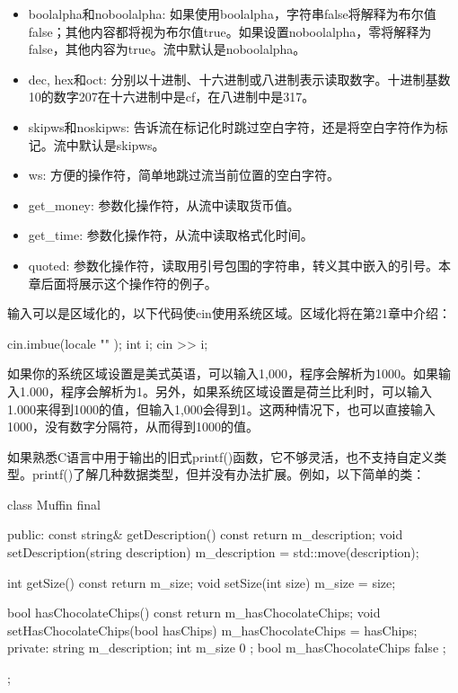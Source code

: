 \begin{itemize}
\item
boolalpha和noboolalpha: 如果使用boolalpha，字符串false将解释为布尔值false；其他内容都将视为布尔值true。如果设置noboolalpha，零将解释为false，其他内容为true。流中默认是noboolalpha。

\item
dec, hex和oct: 分别以十进制、十六进制或八进制表示读取数字。十进制基数10的数字207在十六进制中是cf，在八进制中是317。

\item
skipws和noskipws: 告诉流在标记化时跳过空白字符，还是将空白字符作为标记。流中默认是skipws。

\item
ws: 方便的操作符，简单地跳过流当前位置的空白字符。

\item
get\_money: 参数化操作符，从流中读取货币值。

\item
get\_time: 参数化操作符，从流中读取格式化时间。

\item
quoted: 参数化操作符，读取用引号包围的字符串，转义其中嵌入的引号。本章后面将展示这个操作符的例子。
\end{itemize}

输入可以是区域化的，以下代码使cin使用系统区域。区域化将在第21章中介绍：

\begin{cpp}
cin.imbue(locale { "" });
int i;
cin >> i;
\end{cpp}

如果你的系统区域设置是美式英语，可以输入1,000，程序会解析为1000。如果输入1.000，程序会解析为1。另外，如果系统区域设置是荷兰比利时，可以输入1.000来得到1000的值，但输入1,000会得到1。这两种情况下，也可以直接输入1000，没有数字分隔符，从而得到1000的值。


如果熟悉C语言中用于输出的旧式printf()函数，它不够灵活，也不支持自定义类型。printf()了解几种数据类型，但并没有办法扩展。例如，以下简单的类：

\begin{cpp}
class Muffin final
{
    public:
        const string& getDescription() const { return m_description; }
        void setDescription(string description)
        {
            m_description = std::move(description);
        }

        int getSize() const { return m_size; }
        void setSize(int size) { m_size = size; }

        bool hasChocolateChips() const { return m_hasChocolateChips; }
        void setHasChocolateChips(bool hasChips)
        {
            m_hasChocolateChips = hasChips;
        }
    private:
        string m_description;
        int m_size { 0 };
        bool m_hasChocolateChips { false };
};
\end{cpp}

